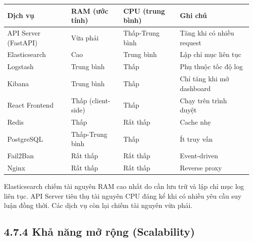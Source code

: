 \documentclass[
  a4paper]{report}
\newcounter{none} %
\begin{document}
{\def\LTcaptype{none} %
\begin{longtable}[]{@{}
  >{\raggedright\arraybackslash}p{}
  >{\raggedright\arraybackslash}p{}
  >{\raggedright\arraybackslash}p{}
  >{\raggedright\arraybackslash}p{}@{}}
\toprule\noalign{}
\begin{minipage}[b]{\linewidth}\raggedright
Dịch vụ
\end{minipage} & \begin{minipage}[b]{\linewidth}\raggedright
RAM (ước tính)
\end{minipage} & \begin{minipage}[b]{\linewidth}\raggedright
CPU (trung bình)
\end{minipage} & \begin{minipage}[b]{\linewidth}\raggedright
Ghi chú
\end{minipage} \\
\midrule\noalign{}
\endhead
\bottomrule\noalign{}
\endlastfoot
API Server (FastAPI) & Vừa phải & Thấp-Trung bình & Tăng khi có nhiều
request \\
Elasticsearch & Cao & Trung bình & Lập chỉ mục liên tục \\
Logstash & Trung bình & Thấp & Phụ thuộc tốc độ log \\
Kibana & Trung bình & Thấp & Chỉ tăng khi mở dashboard \\
React Frontend & Thấp (client-side) & Thấp & Chạy trên trình duyệt \\
Redis & Thấp & Rất thấp & Cache nhẹ \\
PostgreSQL & Thấp-Trung bình & Thấp & Ít truy vấn \\
Fail2Ban & Rất thấp & Rất thấp & Event-driven \\
Nginx & Rất thấp & Rất thấp & Reverse proxy \\
\end{longtable}
}

Elasticsearch chiếm tài nguyên RAM cao nhất do cần lưu trữ và lập chỉ
mục log liên tục. API Server tiêu thụ tài nguyên CPU đáng kể khi có
nhiều yêu cầu suy luận đồng thời. Các dịch vụ còn lại chiếm tài nguyên
vừa phải.

\subsection{4.7.4 Khả năng mở rộng
(Scalability)}\label{khux1ea3-nux103ng-mux1edf-rux1ed9ng-scalability}
\end{document}
